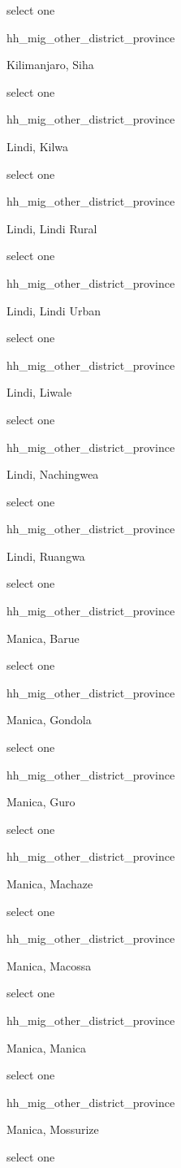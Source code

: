 \documentclass[]{article}
\begin{document}
select one

hh\_mig\_other\_district\_province

Kilimanjaro, Siha

select one

hh\_mig\_other\_district\_province

Lindi, Kilwa

select one

hh\_mig\_other\_district\_province

Lindi, Lindi Rural

select one

hh\_mig\_other\_district\_province

Lindi, Lindi Urban

select one

hh\_mig\_other\_district\_province

Lindi, Liwale

select one

hh\_mig\_other\_district\_province

Lindi, Nachingwea

select one

hh\_mig\_other\_district\_province

Lindi, Ruangwa

select one

hh\_mig\_other\_district\_province

Manica, Barue

select one

hh\_mig\_other\_district\_province

Manica, Gondola

select one

hh\_mig\_other\_district\_province

Manica, Guro

select one

hh\_mig\_other\_district\_province

Manica, Machaze

select one

hh\_mig\_other\_district\_province

Manica, Macossa

select one

hh\_mig\_other\_district\_province

Manica, Manica

select one

hh\_mig\_other\_district\_province

Manica, Mossurize

select one
\end{document}
